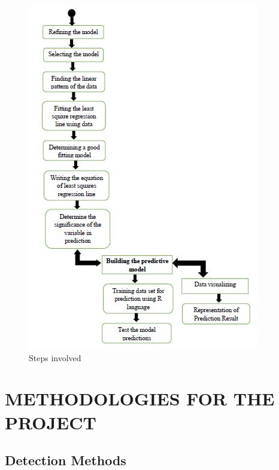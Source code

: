 \begin{figure}[h]
\label{bd}
\centering
\includegraphics[width= 14 cm]{de4.jpeg}
\caption{Steps involved}
\end{figure}






\chapter{METHODOLOGIES FOR THE PROJECT}  %



\section{Detection Methods}

